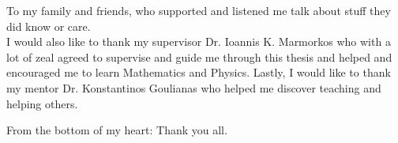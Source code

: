 \thispagestyle{empty} %

To my family and friends, who supported and listened me talk about stuff they did know or care.
\vspace*{20pt}
\\
I would also like to thank my supervisor Dr. Ioannis K. Marmorkos who with a lot of zeal agreed to supervise
and guide me through this thesis and helped and encouraged me to learn Mathematics and Physics. Lastly, I would
like to thank my mentor Dr. Konstantinos Goulianas who helped me discover teaching and helping others.
\\
\begin{flushright}
  From the bottom of my heart: Thank you all.
\end{flushright}
